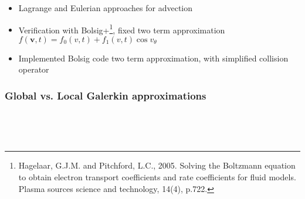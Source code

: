 \documentclass[mathserif, aspectratio=169]{beamer}
\newcommand{\vect}[1]{\boldsymbol{#1}}
\begin{document}
\begin{frame}
\begin{itemize}
		\item Lagrange and Eulerian approaches for advection

		\item Verification with Bolsig+\footnote[frame]{Hagelaar, G.J.M. and Pitchford, L.C., 2005. Solving the Boltzmann equation to obtain electron transport coefficients and rate coefficients for fluid models. Plasma sources science and technology, 14(4), p.722.}, fixed two term approximation $f(\vect{v},t) = f_0(v, t) + f_1(v,t)\cos v_\theta$

		\item Implemented Bolsig code two term approximation, with simplified collision operator
	\end{itemize}
\end{frame}

\begin{frame}[fragile]
	\frametitle{Global vs. Local Galerkin approximations}\
	\vspace{-0.5in}
	\begin{figure}
		\\
	\end{figure}
\end{frame}
\end{document}
